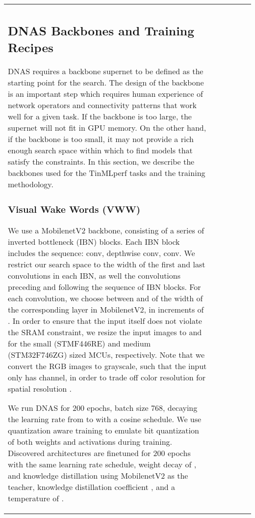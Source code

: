 \documentclass{article}
\begin{document}
\begin{table}[t]
\begin{tabular}{l| c | c | c | c | c}
\subsection{DNAS Backbones and Training Recipes}

DNAS requires a backbone supernet to be defined as the starting point for the search.
The design of the backbone is an important step which requires human experience of network operators and connectivity patterns that work well for a given task.
If the backbone is too large, the supernet will not fit in GPU memory.
On the other hand, if the backbone is too small, it may not provide a rich enough search space within which to find models that satisfy the constraints.
In this section, we describe the backbones used for the TinMLperf tasks and the training methodology.

\subsubsection{Visual Wake Words (VWW)}
We use a MobilenetV2 \cite{sandler2018mobilenetv2} backbone, consisting of a series of inverted bottleneck (IBN) blocks. Each IBN block includes the sequence:  conv,  depthwise conv,   conv. We restrict our search space to the width of the first and last convolutions in each IBN, as well the convolutions preceding and following the sequence of IBN blocks. For each convolution, we choose between  and  of the width of the corresponding layer in MobilenetV2, in increments of . In order to ensure that the input itself does not violate the SRAM constraint, we resize the input images to  and  for the small (STMF446RE) and medium (STM32F746ZG) sized MCUs, respectively. Note that we convert the RGB images to grayscale, such that the input only has  channel, in order to trade off color resolution for spatial resolution \cite{fedorov2019sparse,chowdhery2019visual}. 

We run DNAS for 200 epochs, batch size 768, decaying the learning rate from  to  with a cosine schedule. We use quantization aware training \cite{krishnamoorthi2018quantizing} to emulate bit quantization of both weights and activations during training. Discovered architectures are finetuned for 200 epochs with the same learning rate schedule, weight decay of , and knowledge distillation  using MobilenetV2 as the teacher, knowledge distillation coefficient , and a temperature of  \cite{hinton2015distilling}.

\begin{figure*}
    \centering
    

\end{figure*}
\end{tabular}
\end{table}
\end{document}

